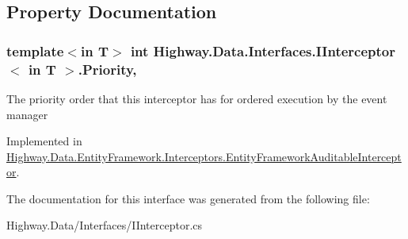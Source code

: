 \subsection{Property Documentation}
\hypertarget{interface_highway_1_1_data_1_1_interfaces_1_1_i_interceptor-g_a7d04e39fcc9ecb1139044cbdda2df23a}{
\subsubsection[{Priority}]{\setlength{\rightskip}{0pt plus 5cm}template$<$in T$>$ int {\bf Highway.\-Data.\-Interfaces.\-I\-Interceptor}$<$ in T $>$.Priority\hspace{0.3cm}{\ttfamily [get]}, {\ttfamily [set]}}}\label{interface_highway_1_1_data_1_1_interfaces_1_1_i_interceptor-g_a7d04e39fcc9ecb1139044cbdda2df23a}


The priority order that this interceptor has for ordered execution by the event manager 



Implemented in \hyperlink{class_highway_1_1_data_1_1_entity_framework_1_1_interceptors_1_1_entity_framework_auditable_interceptor_a49eb8fc89f9eb1b4103f29d4f4c45d6b}{Highway.\-Data.\-Entity\-Framework.\-Interceptors.\-Entity\-Framework\-Auditable\-Interceptor}.



The documentation for this interface was generated from the following file\-:\begin{DoxyCompactItemize}
\item 
Highway.\-Data/\-Interfaces/I\-Interceptor.\-cs\end{DoxyCompactItemize}
